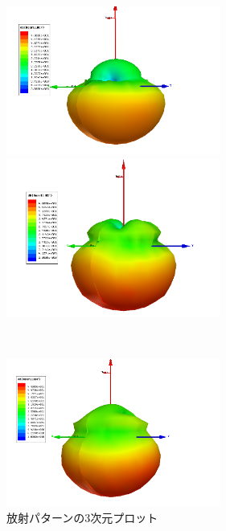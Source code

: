 \documentclass[11pt,a4paper,uplatex]{ujarticle}
\begin{document}
  \begin{figure}[tbp]
    \begin{minipage}[b]{0.495\textwidth}
      \centering
      \includegraphics[keepaspectratio, width=70mm]{Images/near_E_2GHz.png}
    \end{minipage}
    \begin{minipage}[b]{0.495\textwidth}
      \centering
      \includegraphics[keepaspectratio, width=70mm]{Images/near_E_5GHz.png}
    \end{minipage}\\
    \begin{minipage}[b]{0.495\textwidth}
      \centering
      \includegraphics[keepaspectratio, width=70mm]{Images/near_E_10GHz.png}
    \end{minipage}
    \caption{放射パターンの3次元プロット}\label{fig:radiation_pattern_3D}
  \end{figure}
\end{document}
